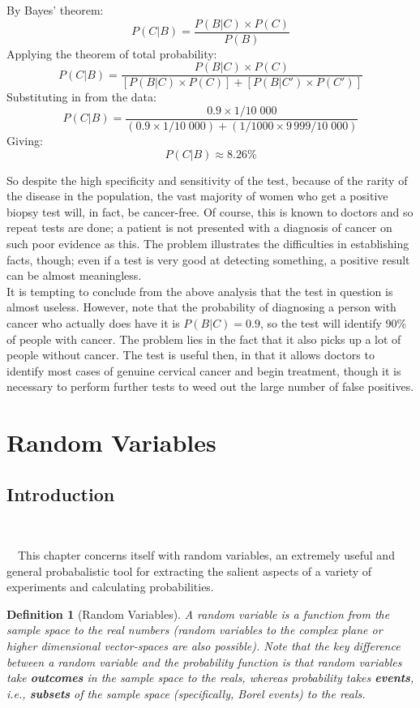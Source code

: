\documentclass[12pt,a4paper]{article}
\newtheorem{defn}[thm]{Definition}
\begin{document}
By Bayes' theorem:
$$P(C|B) = \frac{P(B|C) \times P(C)}{P(B)}$$
Applying the theorem of total probability:
$$P(C|B) = \frac{P(B|C) \times P(C)}{[P(B|C) \times P(C)] + [P(B|C') \times P(C')]}$$
Substituting in from the data:
$$P(C|B) = \frac{0.9 \times 1/10\;000}{(0.9 \times 1/10\;000) + (1/1000 \times 9\,999/10\;000)}$$
Giving:
$$P(C|B) \approx 8.26\%$$

So despite the high specificity and sensitivity of the test, because of the rarity of the disease in the population, the vast majority of women who get a positive biopsy test will, in fact, be cancer-free. Of course, this is known to doctors and so repeat tests are done; a patient is not presented with a diagnosis of cancer on such poor evidence as this. The problem illustrates the difficulties in establishing facts, though; even if a test is very good at detecting something, a positive result can be almost meaningless.\\
\indent It is tempting to conclude from the above analysis that the test in question is almost useless. However, note that the probability of diagnosing a person with cancer who actually does have it is $P(B|C) = 0.9$, so the test will identify 90\% of people with cancer. The problem lies in the fact that it also picks up a lot of people without cancer. The test is useful then, in that it allows doctors to identify most cases of genuine cervical cancer and begin treatment, though it is necessary to perform further tests to weed out the large number of false positives.

\clearpage
\section{Random Variables}

\subsection{Introduction}$\;$

$\quad$This chapter concerns itself with random variables, an extremely useful and general probabalistic tool for extracting the salient aspects of a variety of experiments and calculating probabilities.

\begin{defn}[Random Variables]
\vspace{1cm}

A random variable is a function from the sample space to the real numbers (random variables to the complex plane or higher dimensional vector-spaces are also possible). Note that the key difference between a random variable and the probability function is that random variables take \textbf{outcomes} in the sample space to the reals, whereas probability takes \textbf{events}, i.e., \textbf{subsets} of the sample space (specifically, Borel events) to the reals.
\end{defn}
\end{document}
